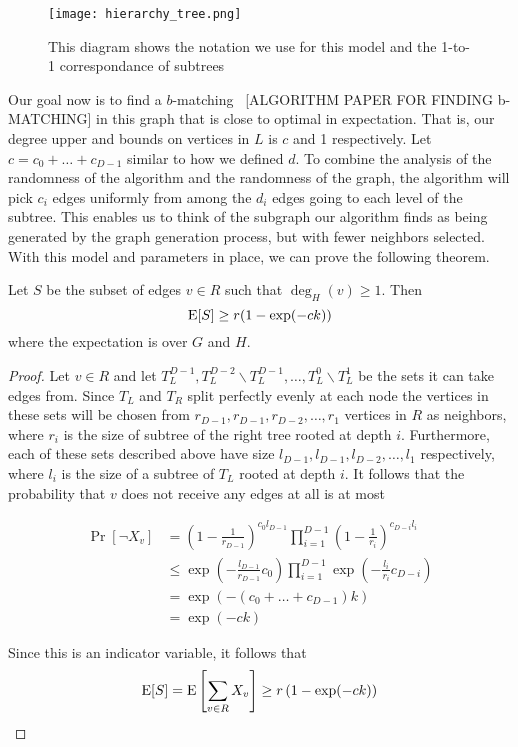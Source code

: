 \begin{figure}[h]
\centering
\texttt{[image: hierarchy\_tree.png]}
\begin{minipage}[h]{0.7\textwidth}
\caption{This diagram shows the notation we use for this model and the 1-to-1 correspondance of subtrees}
\end{minipage}
\end{figure}

Our goal now is to find a $b$-matching~\cite{} [ALGORITHM PAPER FOR FINDING b-MATCHING] in this graph that is close to
optimal in expectation. That is, our degree upper and bounds on vertices in
$L$ is $c$ and 1 respectively. Let $c
= c_0 + \ldots + c_{D-1}$ similar to how we defined $d$. 
To combine the analysis of the randomness of the algorithm
and the randomness of the graph, the algorithm will pick $c_{i}$ edges
uniformly from among the $d_{i}$ edges going to each level of the
subtree. This enables us to think of the subgraph our algorithm
finds as being generated by the graph generation process, but with
fewer neighbors selected. With
this model and parameters in place, we can prove the following
theorem.\

\begin{thm}
Let $S$ be the subset of edges $v\in R$ such that $\deg_H(v) \geq 1$. Then
\[ \text{E}[S] \geq r(1-\exp(-ck)) \]
where the expectation is over $G$ and $H$.
\end{thm}

\begin{proof}
Let $v\in R$ and let $T_L^{D-1}, T_L^{D-2}\backslash T_L^{D-1},
\ldots, T_L^0\backslash T_L^1$ be the sets it can take edges
from. Since $T_L$ and $T_R$ split perfectly evenly at each node the
vertices in these sets will be chosen from $r_{D-1}, r_{D-1},
r_{D-2},\ldots, r_{1}$ vertices in $R$ as neighbors,
where $r_i$ is the size of subtree of the right tree rooted at depth
$i$. Furthermore, each of these sets described above have size
$l_{D-1}, l_{D-1}, l_{D-2}, \ldots, l_{1}$ respectively, where $l_i$
is the size of a subtree of $T_L$ rooted at depth $i$. It follows that
the probability that $v$ does not receive any edges at all is at most

\begin{align*}
	      \Pr[\lnot X_v] 
	&=    \left(1-\frac{1}{r_{D-1}}\right)^{c_0l_{D-1}}\prod_{i=1}^{D-1}\left(1 - \frac{1}{r_i}\right)^{c_{D-i} l_i} \\
	&\leq \exp\left(-\frac{l_{D-1}}{r_{D-1}}c_0\right)\prod_{i=1}^{D-1} \exp\left(-\frac{l_i}{r_i}c_{D-i}\right) \\
	&=    \exp\left(-(c_0 + \ldots + c_{D-1})k\right) \\
	&=    \exp(-ck)
\end{align*}

Since this is an indicator variable, it follows that 
\[ \text{E}[S] = \text{E}\left[\sum_{v \in R} X_v \right] \geq r \left(1-\exp(-ck)\right) \]
\end{proof}

